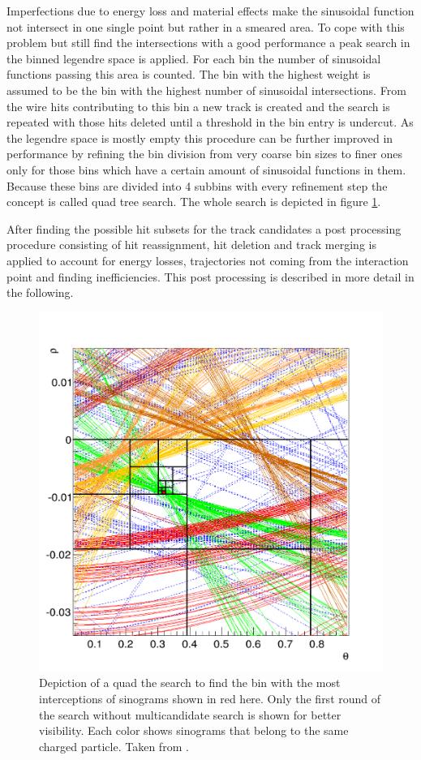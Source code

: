 Imperfections due to energy loss and material effects make the sinusoidal function not intersect in one single point but rather in a smeared area. To cope with this problem but still find the intersections with a good performance a peak search in the binned legendre space is applied. For each bin the number of sinusoidal functions passing this area is counted. The bin with the highest weight is assumed to be the bin with the highest number of sinusoidal intersections. From the wire hits contributing to this bin a new track is created and the search is repeated with those hits deleted until a threshold in the bin entry is undercut. As the legendre space is mostly empty this procedure can be further improved in performance by refining the bin division from very coarse bin sizes to finer ones only for those bins which have a certain amount of sinusoidal functions in them. Because these bins are divided into 4 subbins with every refinement step the concept is called quad tree search. The whole search is depicted in figure \ref{fig-quad-tree-search}.

After finding the possible hit subsets for the track candidates a post processing procedure consisting of hit reassignment, hit deletion and track merging is applied to account for energy losses, trajectories not coming from the interaction point and finding inefficiencies. This post processing is described in more detail in the following.

\begin{figure}
  \centering
  \includegraphics[width=0.6\linewidth]{figures/theory/quad_tree.png}
  \caption[Quad tree search.]{Depiction of a quad the search to find the bin with the most interceptions of sinograms shown in red here. Only the first round of the search without multicandidate search is shown for better visibility. Each color shows sinograms that belong to the same charged particle. Taken from \cite{viktor_dpg}.}
  \label{fig-quad-tree-search}
\end{figure}


